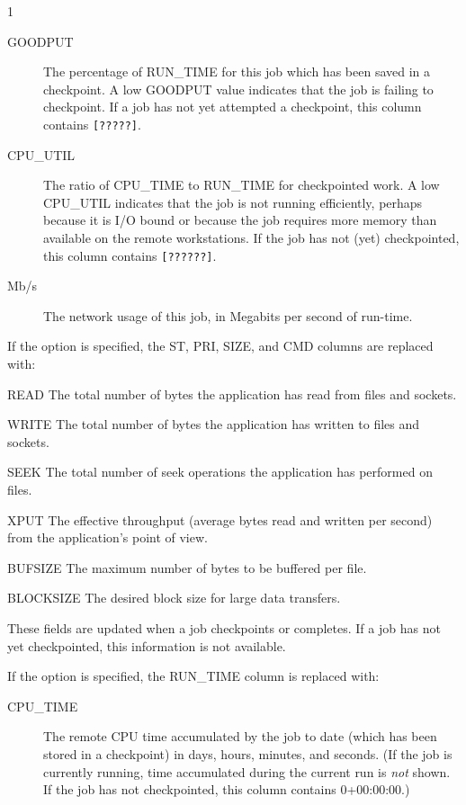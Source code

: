 \begin{ManPage}{\label{man-condor-q}}{1}
\begin{description}
\item[GOODPUT] The percentage of RUN\_TIME for this job which has been
saved in a checkpoint.  A low GOODPUT value indicates that the job is
failing to checkpoint.  If a job has not yet attempted a checkpoint,
this column contains \texttt{[?????]}.
\item[CPU\_UTIL] The ratio of CPU\_TIME to RUN\_TIME for checkpointed
work.  A low CPU\_UTIL indicates that the job is not running
efficiently, perhaps because it is I/O bound or because the job
requires more memory than available on the remote workstations.  If
the job has not (yet) checkpointed, this column contains \texttt{[??????]}.
\item[Mb/s] The network usage of this job, in Megabits per second of
run-time.
\end{description}

If the  option is specified, the ST, PRI, SIZE, and CMD columns
are replaced with:

\begin{description}
\item{READ} The total number of bytes the application has read from files and sockets.
\item{WRITE} The total number of bytes the application has written to files and sockets.
\item{SEEK} The total number of seek operations the application has performed on files.
\item{XPUT} The effective throughput (average bytes read and written per second)
from the application's point of view.
\item{BUFSIZE} The maximum number of bytes to be buffered per file.
\item{BLOCKSIZE} The desired block size for large data transfers.
\end{description}

These fields are updated when a job checkpoints or completes.  If a job
has not yet checkpointed, this information is not available.

If the  option is specified, the RUN\_TIME 
column is replaced with:

\begin{description}
\item[CPU\_TIME] The remote CPU time accumulated by the job to date
(which has been stored in a checkpoint) in days, hours, minutes, and
seconds.  (If the job is currently running, time accumulated during
the current run is \emph{not} shown.  If the job has not checkpointed,
this column contains 0+00:00:00.)
\end{description}


\end{ManPage}
